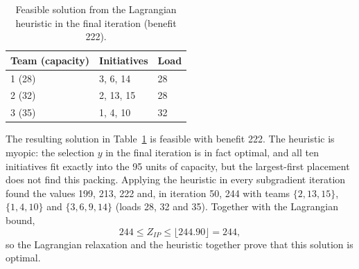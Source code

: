 \begin{table}[h]
\centering
\begin{tabular}{@{}lll@{}}
\toprule
Team (capacity) & Initiatives & Load \\
\midrule
1 (28) & 3, 6, 14 & 28 \\
2 (32) & 2, 13, 15 & 28 \\
3 (35) & 1, 4, 10 & 32 \\
\bottomrule
\end{tabular}
\caption{Feasible solution from the Lagrangian heuristic in the final
iteration (benefit 222).}
\label{tab:q9heur}
\end{table}

The resulting solution in Table~\ref{tab:q9heur} is feasible with benefit
222. The heuristic is myopic: the selection $y$ in the final iteration is in
fact optimal, and all ten initiatives fit exactly into the 95 units of
capacity, but the largest-first placement does not find this packing.
Applying the heuristic in every subgradient iteration found the values 199,
213, 222 and, in iteration 50, 244 with teams $\{2,13,15\}$, $\{1,4,10\}$
and $\{3,6,9,14\}$ (loads 28, 32 and 35). Together with the Lagrangian bound,
\[
244 \le Z_{IP} \le \lfloor 244.90 \rfloor = 244,
\]
so the Lagrangian relaxation and the heuristic together prove that this
solution is optimal.
